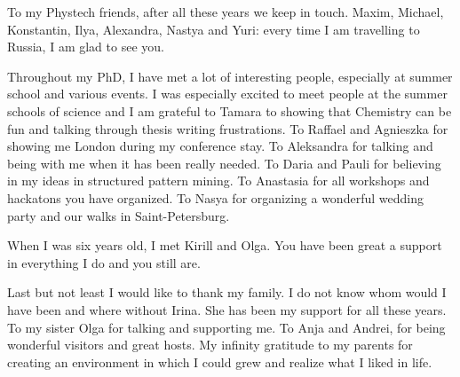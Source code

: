 To my Phystech friends, after all these years we keep in touch. Maxim, Michael, Konstantin, Ilya, Alexandra, Nastya and Yuri: every time I am travelling to Russia, I am glad to see you.

Throughout my PhD, I have met a lot of interesting people, especially at summer school and various events. I was especially excited to meet people at the summer schools of science and I am grateful to Tamara to showing that Chemistry can be fun and talking through thesis writing frustrations. To Raffael and Agnieszka for showing me London during my conference stay. To Aleksandra for talking and being with me when it has been really needed. To Daria and Pauli for believing in my ideas in structured pattern mining. To Anastasia for all workshops and hackatons you have organized. To Nasya for organizing a wonderful wedding party and our walks in Saint-Petersburg. 

When I was six years old, I met Kirill and Olga. You have been great a support in everything I do and you still are.

Last but not least I would like to thank my family. I do not know whom would I have been and where without Irina. She has been my support for all these years. To my sister Olga for talking and supporting me. To Anja and Andrei, for being wonderful visitors and great hosts. My infinity gratitude to my parents for creating an environment in which I could grew and realize what I liked in life.

